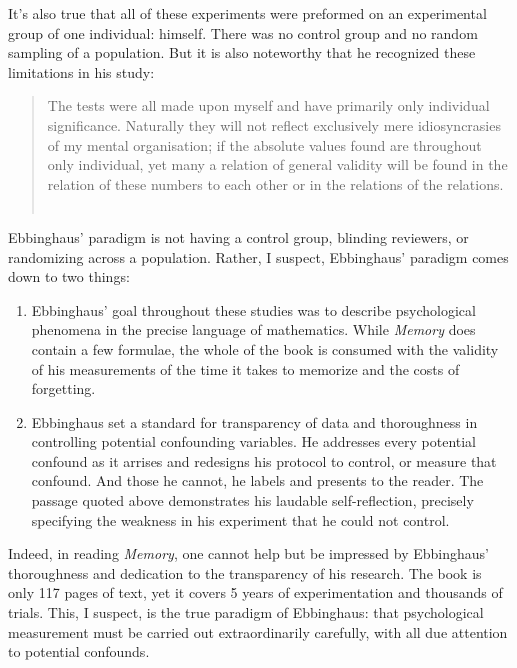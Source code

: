\begin{refsection}
It's also true that all of these experiments were preformed on an experimental group of one individual: himself. There was no control group and no random sampling of a population. But it is also noteworthy that he recognized these limitations in his study: 

\begin{quote}

The tests were all made upon myself and have primarily only individual significance. Naturally they will not reflect exclusively mere idiosyncrasies of my mental organisation; if the absolute values found are throughout only individual, yet many a relation of general validity will be found in the relation of these numbers to each other or in the relations of the relations. ~\citep[Author's preface, p. v]{Ebbinghaus:1885ud}
\end{quote}

Ebbinghaus' paradigm is not having a control group, blinding reviewers, or randomizing across a population. Rather, I suspect, Ebbinghaus' paradigm comes down to two things:

\begin{enumerate}
\item Ebbinghaus' goal throughout these studies was to describe psychological phenomena in the precise language of mathematics. While \emph{Memory} does contain a few formulae, the whole of the book is consumed with the validity of his measurements of the time it takes to memorize and the costs of forgetting.

\item Ebbinghaus set a standard for transparency of data and thoroughness in controlling potential confounding variables. He addresses every potential confound as it arrises and redesigns his protocol to control, or measure that confound. And those he cannot, he labels and presents to the reader. The passage quoted above demonstrates his laudable self-reflection, precisely specifying the weakness in his experiment that he could not control.

\end{enumerate}

Indeed, in reading \emph{Memory}, one cannot help but be impressed by Ebbinghaus' thoroughness and dedication to the transparency of his research. The book is only 117 pages of text, yet it covers 5 years of experimentation and thousands of trials. This, I suspect, is the true paradigm of Ebbinghaus: that psychological measurement must be carried out extraordinarily carefully, with all due attention to potential confounds.


\end{refsection}
